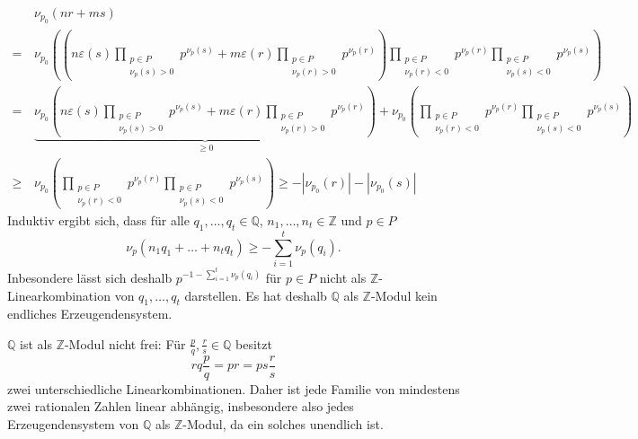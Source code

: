 \documentclass[a4paper,10pt]{article}
\theoremstyle{definition}
\newcommand{\Z}{\mathbb{Z}}
\newcommand{\Q}{\mathbb{Q}}
\begin{document}
\begin{align*}
  &\, \nu_{p_0}( n r + m s ) \\
 =&\, \nu_{p_0} \left( \left( n \varepsilon(s) \prod_{\substack{p \in P \\ \nu_p(s) > 0}} p^{\nu_p(s)}
                            + m \varepsilon(r) \prod_{\substack{p \in P \\ \nu_p(r) > 0}} p^{\nu_p(r)}
               \right)
               \prod_{\substack{p \in P \\ \nu_p(r) < 0}} p^{\nu_p(r)} \prod_{\substack{p \in P \\ \nu_p(s) < 0}} p^{\nu_p(s)} \right) \\
 =&\, \underbrace{\nu_{p_0}\left(n \varepsilon(s) \prod_{\substack{p \in P \\ \nu_p(s) > 0}} p^{\nu_p(s)}
                               + m \varepsilon(r) \prod_{\substack{p \in P \\ \nu_p(r) > 0}} p^{\nu_p(r)}\right) }_{\geq 0}
   +\nu_{p_0}\left(\prod_{\substack{p \in P \\ \nu_p(r) < 0}} p^{\nu_p(r)} \prod_{\substack{p \in P \\ \nu_p(s) < 0}} p^{\nu_p(s)}\right) \\
 \geq&\, \nu_{p_0}\left(\prod_{\substack{p \in P \\ \nu_p(r) < 0}} p^{\nu_p(r)} \prod_{\substack{p \in P \\ \nu_p(s) < 0}} p^{\nu_p(s)}\right) \geq -|\nu_{p_0}(r)|-|\nu_{p_0}(s)|
\end{align*}
Induktiv ergibt sich, dass für alle $q_1, \ldots, q_t \in \Q$, $n_1, \ldots, n_t \in \Z$ und $p \in P$
\[
 \nu_p( n_1 q_1 + \ldots + n_t q_t ) \geq -\sum_{i=1}^t \nu_p(q_i).
\]
Inbesondere lässt sich deshalb $p^{-1-\sum_{i=1}^t \nu_p(q_i)}$ für $p \in P$ nicht als $\Z$-Linearkombination von $q_1, \ldots, q_t$ darstellen. Es hat deshalb $\Q$ als $\Z$-Modul kein endliches Erzeugendensystem.

$\Q$ ist als $\Z$-Modul nicht frei: Für $\frac{p}{q}, \frac{r}{s} \in \Q$ besitzt
\[
 rq \frac{p}{q} = pr = ps \frac{r}{s}
\]
zwei unterschiedliche Linearkombinationen. Daher ist jede Familie von mindestens zwei rationalen Zahlen linear abhängig, insbesondere also jedes Erzeugendensystem von $\Q$ als $\Z$-Modul, da ein solches unendlich ist.
\end{document}
